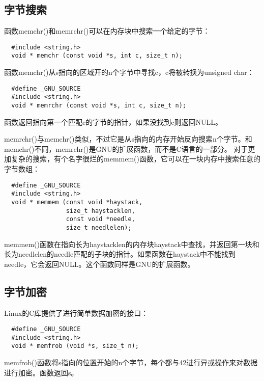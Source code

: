 \subsection{字节搜索}

函数memchr()和memrchr()可以在内存块中搜索一个给定的字节： 

\begin{lstlisting}
  #include <string.h>
  void * memchr (const void *s, int c, size_t n);
\end{lstlisting}

函数memchr()从s指向的区域开的n个字节中寻找c，c将被转换为unsigned char： 

\begin{lstlisting}
  #define _GNU_SOURCE
  #include <string.h>
  void * memrchr (const void *s, int c, size_t n);
\end{lstlisting}

函数返回指向第一个匹配c的字节的指针，如果没找到c则返回NULL。

memrchr()与memchr()类似，不过它是从s指向的内存开始反向搜索n个字节。和memchr()不同，memrchr()是GNU的扩展函数，而不是C语言的一部分。 对于更加复杂的搜索，有个名字很烂的memmem()函数，它可以在一块内存中搜索任意的字节数组： 

\begin{lstlisting}
  #define _GNU_SOURCE
  #include <string.h>
  void * memmem (const void *haystack,
                 size_t haystacklen,
                 const void *needle,
                 size_t needlelen);
\end{lstlisting}

memmem()函数在指向长为haystacklen的内存块haystack中查找，并返回第一块和长为needlelen的needle匹配的子块的指针。如果函数在haystack中不能找到needle，它会返回NULL。这个函数同样是GNU的扩展函数。 

\subsection{字节加密}

Linux的C库提供了进行简单数据加密的接口：

\begin{lstlisting}
  #define _GNU_SOURCE
  #include <string.h>
  void * memfrob (void *s, size_t n);
\end{lstlisting}

memfrob()函数将s指向的位置开始的n个字节，每个都与42进行异或操作来对数据进行加密。函数返回s。

